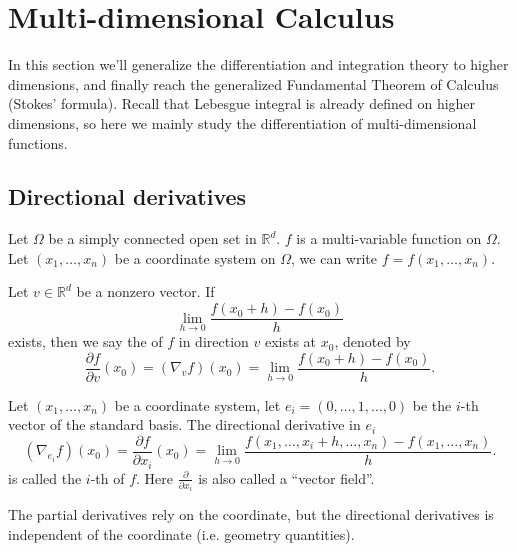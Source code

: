 \section{Multi-dimensional Calculus}
\label{sec:Multi-dimensional Calculus}

In this section we'll generalize the differentiation and integration theory
to higher dimensions, and finally reach the generalized Fundamental
Theorem of Calculus (Stokes' formula). Recall that Lebesgue integral is already
defined on higher dimensions, so here we mainly study the differentiation
of multi-dimensional functions.

\subsection{Directional derivatives}
\label{sub:Directional derivatives}

Let $\Omega$ be a simply connected open set in $\mathbb{R}^{d}$.
$f$ is a multi-variable function on $\Omega$.
Let $(x_1,\dots, x_n)$ be a coordinate system on $\Omega$,
we can write $f = f(x_1, \dots, x_n)$.

\begin{definition}
	Let $v \in \mathbb{R}^d$ be a nonzero vector. If
	\[
	\lim_{h\to 0} \frac{f(x_0+h)-f(x_0)}{h}
	\]
	exists, then we say the  of $f$ in direction $v$
	exists at $x_0$, denoted by
	\[
		\frac{\partial f}{\partial v}(x_0) = (\nabla_v f) (x_0)
		= \lim_{h\to 0}\frac{f(x_0+h) - f(x_0)}{h}.
	\]
\end{definition}
\begin{definition}
	Let $(x_1,\dots, x_n)$ be a coordinate system, let $e_i = (0,\dots,1,\dots,0)$ be
	the $i$-th vector of the standard basis.
	The directional derivative in $e_i$
	\[
		(\nabla_{e_i} f)(x_0) = \frac{\partial f}{\partial x_i}(x_0)
		= \lim_{h\to 0}\frac{f(x_1,\dots,x_i+h,\dots,x_n) - f(x_1,\dots,x_n)}{h}.
	\]
	is called the $i$-th  of $f$.
	Here $\frac{\partial}{\partial x_i}$ is also called a ``vector field''.
\end{definition}
\begin{remark}
    The partial derivatives rely on the coordinate, but the directional
	derivatives is independent of the coordinate (i.e. geometry quantities).
\end{remark}

